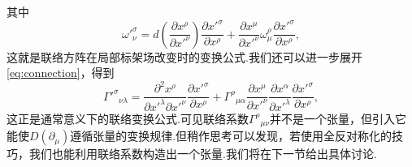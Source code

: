 		其中
		\begin{equation}\label{eq:connection}
		{\omega'}^\sigma_\nu=d\left(\frac{\partial{x^\rho}}{\partial{x'}^\nu}\right)\frac{\partial{{x'}^\sigma}}{\partial{x^\rho}}+\frac{\partial{x^\mu}}{\partial{x'}^\nu}\omega^\rho_\mu\frac{\partial{{x'}^\sigma}}{\partial{x^\rho}},
		\end{equation}
		这就是联络方阵在局部标架场改变时的变换公式.我们还可以进一步展开\ref{eq:connection}，得到
		\begin{equation}
		{{\Gamma'}^\sigma}_{\nu\lambda}=\frac{\partial^2{x^\rho}}{\partial{x'}^\lambda\partial{x'}^\nu}\frac{\partial{{x'}^\sigma}}{\partial{x^\rho}}+{\Gamma^\rho}_{\mu\alpha}\frac{\partial{x^\mu}}{\partial{x'}^\nu}\frac{\partial{x}^\alpha}{\partial{x'}^\lambda}\frac{\partial{{x'}^\sigma}}{\partial{x^\rho}},
		\end{equation}
		这正是通常意义下的联络变换公式.可见联络系数${\Gamma^\rho}_{\mu\nu}$并不是一个张量，但引入它能使$D(\partial_\mu)$遵循张量的变换规律.但稍作思考可以发现，若使用全反对称化的技巧，我们也能利用联络系数构造出一个张量.我们将在下一节给出具体讨论.
	

